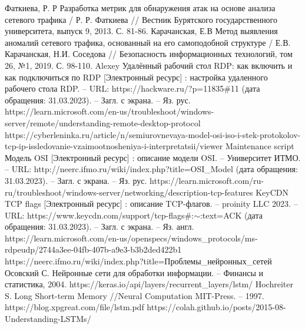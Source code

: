 \documentclass[bachelor, och, coursework]{SCWorks}
\begin{document}
\begin{thebibliography}{15}
    Фаткиева, Р. Р Разработка метрик для обнаружения атак на основе анализа сетевого трафика / Р. Р. Фаткиева // Вестник Бурятского государственного университета, выпуск 9, 2013. С. 81-86.
    Карачанская, Е.В Метод выявления аномалий сетевого трафика, основанный на его самоподобной структуре / Е.В. Карачанская, Н.И. Соседова // Безопасность информационных технологий, том 26, №1, 2019. С. 98-110.
    Alexey Удалённый рабочий стол RDP: как включить и как подключиться по RDP [Электронный ресурс] : настройка удаленного рабочего стола RDP. -- URL: https://hackware.ru/?p=11835\#11 (дата обращения: 31.03.2023). -- Загл. с экрана. -- Яз. рус.
    https://learn.microsoft.com/en-us/troubleshoot/windows-server/remote/understanding-remote-desktop-protocol
    https://cyberleninka.ru/article/n/semiurovnevaya-model-osi-iso-i-stek-protokolov-tcp-ip-issledovanie-vzaimootnosheniya-i-interpretatsii/viewer
    Maintenance script Модель OSI [Электронный ресурс] : описание модели OSI. -- Университет ИТМО. -- URL: http://neerc.ifmo.ru/wiki/index.php?title=OSI_Model (дата обращения: 31.03.2023). -- Загл. с экрана. --  Яз. рус.
    https://learn.microsoft.com/ru-ru/troubleshoot/windows-server/networking/description-tcp-features
    KeyCDN TCP flags [Электронный ресурс] : описание TCP-флагов. -- proinity LLC 2023. -- URL: https://www.keycdn.com/support/tcp-flags\#:$\sim$:text=ACK (дата обращения: 31.03.2023). -- Загл. с экрана. --  Яз. англ.
    https://learn.microsoft.com/en-us/openspecs/windows_protocols/ms-rdpeudp/2744a3ee-04fb-407b-a9e3-b3b2ded422b1
    https://neerc.ifmo.ru/wiki/index.php?title=Проблемы_нейронных_сетей
    Осовский С. Нейронные сети для обработки информации. -- Финансы и статистика, 2004.
    https://keras.io/api/layers/recurrent_layers/lstm/
    Hochreiter S. Long Short-term Memory //Neural Computation MIT-Press. -- 1997. https://blog.xpgreat.com/file/lstm.pdf
    https://colah.github.io/posts/2015-08-Understanding-LSTMs/

\end{thebibliography}
\end{document}

